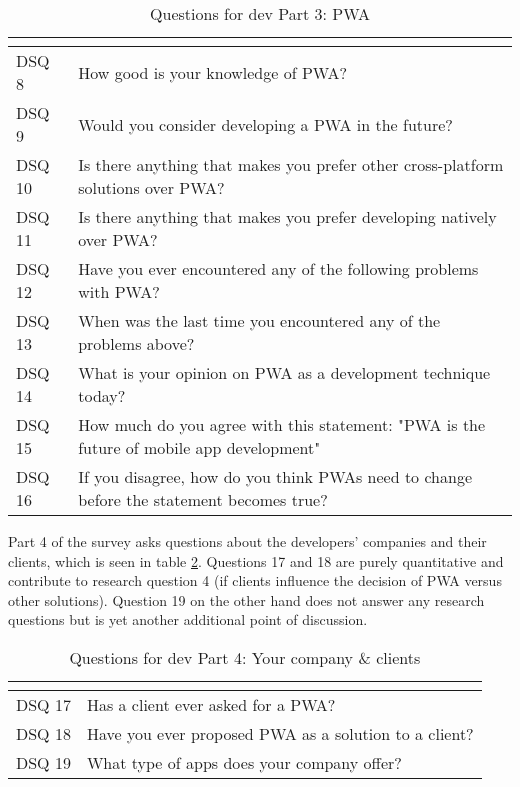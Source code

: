 \documentclass[a4paper,12pt]{article}
\begin{document}
\begin{table}[h]
\centering
{}
\begin{tabular}{|l|p{11cm}|}
\hline
\rowcolor[HTML]{656565} 
\multicolumn{1}{|c|}{\cellcolor[HTML]{656565}{\color[HTML]{FFFFFF} Number}} & \multicolumn{1}{l|}{\cellcolor[HTML]{656565}{\color[HTML]{FFFFFF} Question}} \\ \hline
DSQ 8 & How good is your knowledge of PWA? \\
DSQ 9 & Would you consider developing a PWA in the future? \\
DSQ 10 & Is there anything that makes you prefer other cross-platform solutions over PWA? \\
DSQ 11 & Is there anything that makes you prefer developing natively over PWA? \\
DSQ 12 & Have you ever encountered any of the following problems with PWA? \\
DSQ 13 & When was the last time you encountered any of the problems above? \\
DSQ 14 & What is your opinion on PWA as a development technique today? \\
DSQ 15 & How much do you agree with this statement: "PWA is the future of mobile app development" \\
DSQ 16 & If you disagree, how do you think PWAs need to change before the statement becomes true? \\
\hline
\end{tabular}
\caption{Questions for dev Part 3: PWA}
\label{tab:devq3}
\end{table}

\newpage Part 4 of the survey asks questions about the developers’ companies and their clients, which is seen in table \ref{tab:devq4}. Questions 17 and 18 are purely quantitative and contribute to research question 4 (if clients influence the decision of PWA versus other solutions). Question 19 on the other hand does not answer any research questions but is yet another additional point of discussion.

\begin{table}[ht]
\centering
{}
\begin{tabular}{|l|l|}
\hline
\rowcolor[HTML]{656565} 
\multicolumn{1}{|c|}{\cellcolor[HTML]{656565}{\color[HTML]{FFFFFF} Number}} & \multicolumn{1}{l|}{\cellcolor[HTML]{656565}{\color[HTML]{FFFFFF} Question}} \\ \hline
DSQ 17 & Has a client ever asked for a PWA? \\
DSQ 18 & Have you ever proposed PWA as a solution to a client? \\
DSQ 19 & What type of apps does your company offer? \\
\hline
\end{tabular}
\caption{Questions for dev Part 4: Your company \& clients}
\label{tab:devq4}
\end{table}
\end{document}
